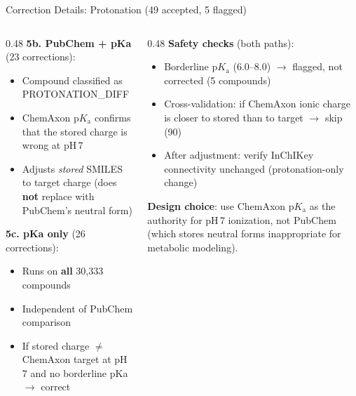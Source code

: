 \documentclass[aspectratio=169,11pt]{beamer}
\begin{document}
\begin{frame}{Correction Details: Protonation (49 accepted, 5 flagged)}

\begin{columns}[T]
\begin{column}{0.48\textwidth}
\footnotesize
\textbf{5b. PubChem + pKa} (23 corrections):
\begin{itemize}\setlength\itemsep{1pt}
  \item Compound classified as PROTONATION\_DIFF
  \item ChemAxon $\mathrm{p}K_\mathrm{a}$ confirms that
        the stored charge is wrong at pH\,7
  \item Adjusts \textit{stored} SMILES to target charge
        (does \textbf{not} replace with PubChem's neutral form)
\end{itemize}

\smallskip
\textbf{5c. pKa only} (26 corrections):
\begin{itemize}\setlength\itemsep{1pt}
  \item Runs on \textbf{all} 30,333 compounds
  \item Independent of PubChem comparison
  \item If stored charge $\neq$ ChemAxon target at pH\,7
        and no borderline pKa $\to$ correct
\end{itemize}
\end{column}

\begin{column}{0.48\textwidth}
\footnotesize
\textbf{Safety checks} (both paths):
\begin{itemize}\setlength\itemsep{1pt}
  \item Borderline $\mathrm{p}K_\mathrm{a}$ (6.0--8.0)
        $\to$ flagged, not corrected (5 compounds)
  \item Cross-validation: if ChemAxon ionic charge
        is closer to stored than to target $\to$ skip (90)
  \item After adjustment: verify InChIKey connectivity
        unchanged (protonation-only change)
\end{itemize}

\smallskip
\textbf{Design choice}: use ChemAxon $\mathrm{p}K_\mathrm{a}$
as the authority for pH\,7 ionization, not PubChem
(which stores neutral forms inappropriate for metabolic
modeling).
\end{column}
\end{columns}

\end{frame}
\end{document}
